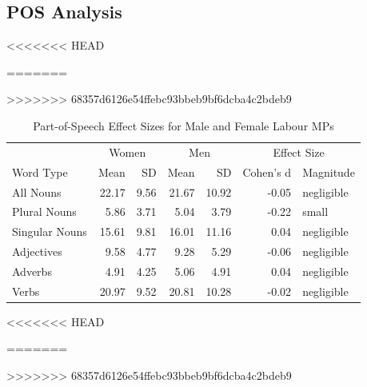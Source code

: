 \documentclass[]{article}
\theoremstyle{definition}
\theoremstyle{definition}
\theoremstyle{definition}
\theoremstyle{remark}
\begin{document}
\begin{table}[H]
\begin{table}[H]
\begin{table}[H]
\begin{table}[H]
\begin{table}[H]
\begin{table}[H]
\hypertarget{pos-analysis}{%
\subsection{POS Analysis}\label{pos-analysis}}

<<<<<<< HEAD
\begin{table}[H]
=======
\begin{table}
>>>>>>> 68357d6126e54ffebc93bbeb9bf6dcba4c2bdeb9

\caption{\label{tab:pos-gender-table}Part-of-Speech Effect Sizes for Male and Female Labour MPs}
\centering
\begin{tabular}[t]{lrrrrrl}
\toprule
\multicolumn{1}{c}{ } & \multicolumn{2}{c}{Women} & \multicolumn{2}{c}{Men} & \multicolumn{2}{c}{Effect Size} \\
\cmidrule(l{2pt}r{2pt}){2-3} \cmidrule(l{2pt}r{2pt}){4-5} \cmidrule(l{2pt}r{2pt}){6-7}
Word Type & Mean & SD & Mean & SD & Cohen's d & Magnitude\\
\midrule
All Nouns & 22.17 & 9.56 & 21.67 & 10.92 & -0.05 & negligible\\
\hspace{1em}Plural Nouns & 5.86 & 3.71 & 5.04 & 3.79 & -0.22 & small\\
\hspace{1em}Singular Nouns & 15.61 & 9.81 & 16.01 & 11.16 & 0.04 & negligible\\
Adjectives & 9.58 & 4.77 & 9.28 & 5.29 & -0.06 & negligible\\
Adverbs & 4.91 & 4.25 & 5.06 & 4.91 & 0.04 & negligible\\
Verbs & 20.97 & 9.52 & 20.81 & 10.28 & -0.02 & negligible\\
\bottomrule
\end{tabular}
\end{table}

<<<<<<< HEAD
\begin{table}[H]
=======
\begin{table}
>>>>>>> 68357d6126e54ffebc93bbeb9bf6dcba4c2bdeb9


\end{table}
\end{table}
\end{table}
\end{table}
\end{table}
\end{table}
\end{table}
\end{table}
\end{table}
\end{document}
